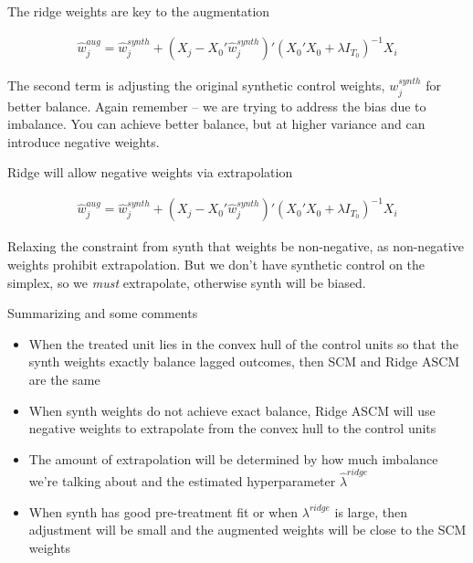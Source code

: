 \documentclass{beamer}
\begin{document}
\begin{frame}{The ridge weights are key to the augmentation}

\begin{eqnarray*}
\widehat{w}_j^{aug} = \widehat{w}_j^{synth} + (X_j - X_0' \widehat{w}_j^{synth}) ' (X_0'X_0 + \lambda I_{T_0})^{-1}X_i
\end{eqnarray*}

The second term is adjusting the original synthetic control weights, $w_j^{synth}$ for better balance. Again remember -- we are trying to address the bias due to imbalance. You can achieve better balance, but at higher variance and can introduce negative weights. 

\end{frame}



\begin{frame}{Ridge will allow negative weights via extrapolation}

\begin{eqnarray*}
\widehat{w}_j^{aug} = \widehat{w}_j^{synth} + (X_j - X_0' \widehat{w}_j^{synth}) ' (X_0'X_0 + \lambda I_{T_0})^{-1}X_i
\end{eqnarray*}

Relaxing the constraint from synth that weights be non-negative, as non-negative weights prohibit extrapolation. But we don't have synthetic control on the simplex, so we \emph{must} extrapolate, otherwise synth will be biased.

\end{frame}



\begin{frame}{Summarizing and some comments}

\begin{itemize}
\item When the treated unit lies in the convex hull of the control units so that the synth weights exactly balance lagged outcomes, then SCM and Ridge ASCM are the same
\item When synth weights do not achieve exact balance, Ridge ASCM will use negative weights to extrapolate from the convex hull to the control units
\item The amount of extrapolation will be determined by how much imbalance we're talking about and the estimated hyperparameter $\widehat{\lambda}^{ridge}$
\item When synth has good pre-treatment fit or when $\lambda^{ridge}$ is large, then adjustment will be small and the augmented weights will be close to the SCM weights
\end{itemize}

\end{frame}
\end{document}
